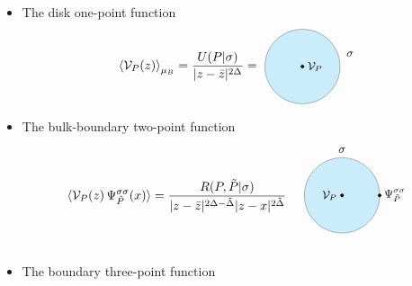 \documentclass[a4paper]{article}
\begin{document}
\begin{itemize}
  \item The disk one-point function 
  \begin{equation}  
\left\langle \mathcal{V}_{P}(z)\right\rangle_{\mu_B} = \frac{U(P|\sigma)}{|z-\bar{z}|^{2\Delta}} =~ \begin{tikzpicture}[baseline={([yshift=-.5ex]current bounding box.center)}, scale=0.7]
\draw[fill=cyan!40!white,opacity=0.5] (0,0) ellipse (1.5 and 1.5);
\draw[fill] (0,0) circle (0.06);
\node at (1.9,0.5) {\small $\sigma$};
\node at (0.5,0) {\small $\mathcal{V}_{P}$};
\end{tikzpicture}
\end{equation}
  \item The bulk-boundary two-point function
\begin{equation}  
\hspace{0cm}\langle \mathcal{V}_P(z) \, \Psi^{\sigma \sigma}_{\tilde{P}}(x) \rangle = \frac{R(P,\tilde{P}|\sigma)}{|z-\bar{z}|^{2\Delta-\tilde{\Delta}}|z-x|^{2\tilde{\Delta}}}\hspace{0.5cm} \begin{tikzpicture}[baseline={([yshift=-.5ex]current bounding box.center)}, scale=0.7]
\draw[fill=cyan!40!white,opacity=0.5] (0,0) ellipse (1.5 and 1.5);
\draw[fill] (1.5,0) circle (0.06); 
\node at (0,-1.985) {};
\node at (0,1.8) {\small $\sigma$};
\draw[fill] (0,0) circle (0.06);
\node at (-0.5,0) {\small $\mathcal{V}_P$};
\node at (2.1,0) {\small $\Psi^{\sigma \sigma}_{\tilde{P}}$};
\end{tikzpicture}
\vspace{-0.4cm}
\end{equation}
\item The boundary three-point function


\end{itemize}
\end{document}

